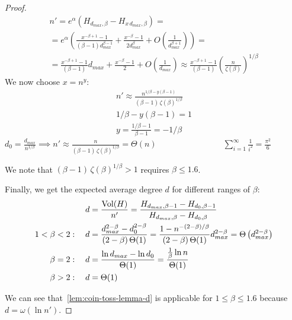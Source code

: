 \begin{proof}
\begin{gather*}
        n'=e^\alpha\left(H_{d_{max},\beta}-H_{x\,d_{max},\beta}\right)=\\
        =e^\alpha\left(
            \frac{x^{-\beta+1}-1}{(\beta-1)d_{max}^{\beta-1}}
            +\frac{x^{-\beta}-1}{2d_{max}^\beta}
            +O\left(\frac{1}{d_{max}^{\beta+1}}\right)
        \right)=\\
        =\frac{x^{-\beta+1}-1}{(\beta-1)}d_{max}
        +\frac{x^{-\beta}-1}{2}
        +O\left(\frac{1}{d_{max}}\right)
        \approx\frac{x^{-\beta+1}-1}{(\beta-1)}\left(\frac{n}{\zeta(\beta)}\right)^{1/\beta}
    \end{gather*}
    We now choose $x=n^y$:
    \begin{gather*}
        n'\approx\frac{n^{1/\beta-y(\beta-1)}}{(\beta-1)\,\zeta(\beta)^{1/\beta}}\\
        1/\beta-y(\beta-1)=1\\
        y=\frac{1/\beta-1}{\beta-1}=-1/\beta
    \end{gather*}
    $d_0=\frac{d_{max}}{n^{1/\beta}}\implies
    n'\approx\frac{n}{(\beta-1)\,\zeta(\beta)^{1/\beta}}=\Theta(n)
    \qquad\qquad\qquad\qquad\sum_{i=1}^{\infty}{\frac{1}{i^2}}=\frac{\pi^2}{6}$
        
    We note that $(\beta-1)\,\zeta(\beta)^{1/\beta}>1$ requires $\beta\leq 1.6$.

    Finally, we get the expected average degree $d$ for different ranges of $\beta$:
    \begin{align*}
        d&=\frac{\operatorname*{Vol}(H)}{n'}=\frac{H_{d_{max},\beta-1}-H_{d_0,\beta-1}}{H_{d_{max},\beta}-H_{d_0,\beta}}\\
        1<\beta<2:\quad d&=\frac{d_{max}^{2-\beta}-d_0^{2-\beta}}{(2-\beta)\,\Theta(1)}
        =\frac{1-n^{-(2-\beta)/\beta}}{(2-\beta)\,\Theta(1)}d_{max}^{2-\beta}=\Theta\left(d_{max}^{2-\beta}\right)\\
        \beta=2:\quad d&=\frac{\ln d_{max}-\ln d_0}{\Theta(1)}=\frac{\frac{1}{\beta}\ln n}{\Theta(1)}\\
        \beta>2:\quad d&=\Theta(1)
    \end{align*}
    
    We can see that~\autoref{lem:coin-toss-lemma-d} is applicable for
    $1\leq\beta\leq 1.6$ because $d=\omega(\ln n')$.
\end{proof}

